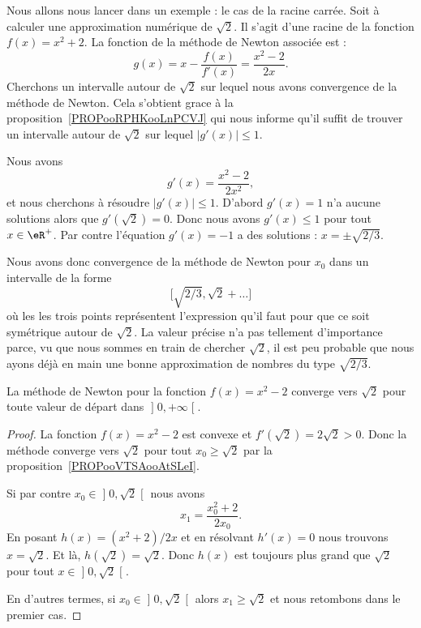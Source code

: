 Nous allons nous lancer dans un exemple : le cas de la racine carrée. Soit à calculer une approximation numérique de \( \sqrt{ 2 }\). Il s'agit d'une racine de la fonction \( f(x)=x^2+2\). La fonction de la méthode de Newton associée est :
\begin{equation}
    g(x)=x-\frac{ f(x) }{ f'(x) }=\frac{ x^2-2 }{ 2x }.
\end{equation}
Cherchons un intervalle autour de \( \sqrt{ 2 }\) sur lequel nous avons convergence de la méthode de Newton. Cela s'obtient grace à la proposition~\ref{PROPooRPHKooLnPCVJ} qui nous informe qu'il suffit de trouver un intervalle autour de \( \sqrt{ 2 }\) sur lequel \( | g'(x) |\leq 1\).

Nous avons
\begin{equation}
    g'(x)=\frac{ x^2-2 }{ 2x^2 },
\end{equation}
et nous cherchons à résoudre \( | g'(x) |\leq 1\). D'abord \( g'(x)=1\) n'a aucune solutions alors que \( g'(\sqrt{ 2 })=0\). Donc nous avons \(  g'(x) \leq 1\) pour tout \( x\in \eR^+\). Par contre l'équation \( g'(x)=-1\) a des solutions : \( x=\pm\sqrt{ 2/3 }\).

Nous avons donc convergence de la méthode de Newton pour \( x_0\) dans un intervalle de la forme
\begin{equation}
    \mathopen[ \sqrt{ 2/3 } , \sqrt{ 2 }+\ldots \mathclose]
\end{equation}
où les les trois points représentent l'expression qu'il faut pour que ce soit symétrique autour de \( \sqrt{ 2 }\). La valeur précise n'a pas tellement d'importance parce, vu que nous sommes en train de chercher \( \sqrt{ 2 }\), il est peu probable que nous ayons déjà en main une bonne approximation de nombres du type \( \sqrt{ 2/3 }\).

\begin{proposition}
La méthode de Newton pour la fonction \( f(x)=x^2-2\) converge vers \( \sqrt{ 2 }\) pour toute valeur de départ dans \( \mathopen] 0 , +\infty \mathclose[\).
\end{proposition}

\begin{proof}
    La fonction \( f(x)=x^2-2\) est convexe et \( f'(\sqrt{ 2 })=2\sqrt{ 2 }>0\). Donc la méthode converge vers \( \sqrt{ 2 }\) pour tout \( x_0\geq \sqrt{ 2 }\) par la proposition~\ref{PROPooVTSAooAtSLeI}.

    Si par contre \( x_0\in\mathopen] 0 , \sqrt{ 2 } \mathclose[\) nous avons
        \begin{equation}
            x_1=\frac{ x_0^2+2 }{ 2x_0 }.
        \end{equation}
    En posant \( h(x)=(x^2+2)/2x\) et en résolvant \( h'(x)=0\) nous trouvons \( x=\sqrt{ 2 }\). Et là, \( h(\sqrt{ 2 })=\sqrt{ 2 }\). Donc \( h(x)\) est toujours plus grand que \( \sqrt{ 2 }\) pour tout \( x\in\mathopen] 0 , \sqrt{ 2 } \mathclose[\).

    En d'autres termes, si \( x_0\in\mathopen] 0 , \sqrt{ 2 } \mathclose[\) alors \( x_1\geq \sqrt{ 2 }\) et nous retombons dans le premier cas.
\end{proof}

